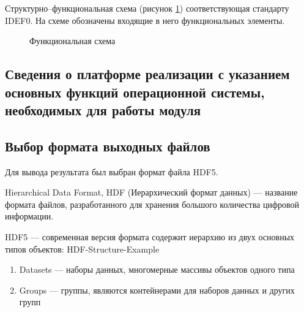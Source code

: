 Структурно--функциональная схема (рисунок \ref{pic:idef0}) соответствующая стандарту IDEF0. На схеме обозначены входящие в него функциональных элементы. %

\begin{figure}[h!]
\caption{Функциональная схема}
\label{pic:idef0}
\end{figure}

\subsection{Сведения о платформе реализации с указанием основных функций операционной системы, необходимых для работы модуля}


\subsection {Выбор формата выходных файлов}
Для вывода результата был выбран формат файла HDF5. 

Hierarchical Data Format, HDF (Иерархический формат данных) — название формата файлов, разработанного для хранения большого количества цифровой информации.

HDF5 — современная версия формата содержит иерархию из двух основных типов объектов:
HDF-Structure-Example
\begin{enumerate}
\item Datasets — наборы данных, многомерные массивы объектов одного типа
\item Groups — группы, являются контейнерами для наборов данных и других групп
\end{enumerate}
    

